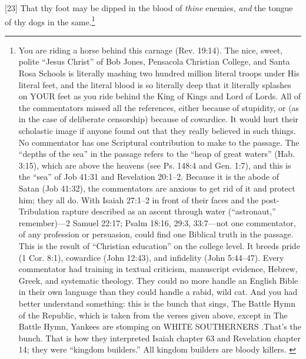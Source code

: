 [23] \textcolor[rgb]{0.00,0.00,1.00}{That thy foot may be dipped in the blood of \emph{thine} enemies, \emph{and} the tongue of thy dogs in the same.}\footnote{You are riding a horse behind this carnage (Rev. 19:14). The nice, sweet, polite “Jesus Christ” of Bob Jones, Pensacola Christian College, and Santa Rosa Schools is literally mashing two hundred million literal troops under 
His literal feet, and the literal blood is so literally deep that it literally splashes on YOUR feet as you ride behind the King of Kings and Lord of Lords. All of the commentators missed all the references, either because of stupidity, or (as in the case of deliberate censorship) because of cowardice. It would hurt their scholastic image if anyone found out that they really believed in such things. No commentator has one Scriptural contribution to make to the passage. The “depths of the sea” in the passage refers to the “heap of great waters” (Hab. 3:15), which are above the heavens (see Ps. 148:4 and Gen. 1:7), and this is the “sea” of Job 41:31 and Revelation 20:1–2. Because it is the abode of Satan (Job 41:32), the commentators are anxious to get rid of it and protect him; they all do. With Isaiah 27:1–2 in front of their faces and the post-Tribulation rapture described as an ascent through water (“astronaut,” remember)—2 Samuel 22:17; Psalm 18:16, 29:3, 33:7—not one commentator, of any profession or persuasion, could find one Biblical truth in the passage. This is the result of “Christian education” on the college level. It breeds pride (1 Cor. 8:1), cowardice (John 12:43), and infidelity (John 5:44–47). Every commentator had training in textual criticism, manuscript evidence, Hebrew, Greek, and systematic theology. They could no more handle an English Bible in their own language than they could handle a rabid, wild cat. And you had better understand something: this is the bunch that sings, The Battle Hymn of the Republic, which is taken from the verses given above, except in The Battle Hymn, Yankees are stomping on WHITE SOUTHERNERS .That’s the bunch. That is how they interpreted Isaiah chapter 63 and Revelation chapter 14; they were “kingdom builders.” All kingdom builders are bloody killers.  \cite{Ruckman1992Psalms}  }

